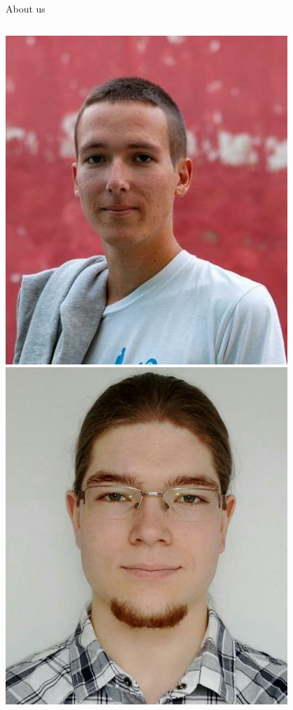 \documentclass[NET,english,aspectratio=169,notitleframe,draft]{tumbeamer}
\begin{document}
\begin{frame}{About us}
\begin{columns}
\begin{column}{0.15\textwidth}
\includegraphics[width=0.8\textwidth]{pics/simon.jpg}\\
\includegraphics[width=0.8\textwidth]{pics/sebastian.jpg}
\end{column}
\end{columns}
\end{frame}
\end{document}
